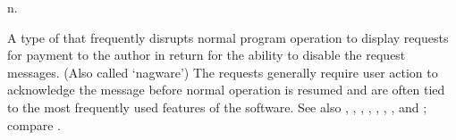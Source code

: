  n.

A type of  that frequently disrupts normal program
operation to display requests for payment to the author in return for
the ability to disable the request messages. (Also called `nagware') The
requests generally require user action to acknowledge the message before
normal operation is resumed and are often tied to the most frequently
used features of the software. See also ,
, , ,
, , , and
; compare .

